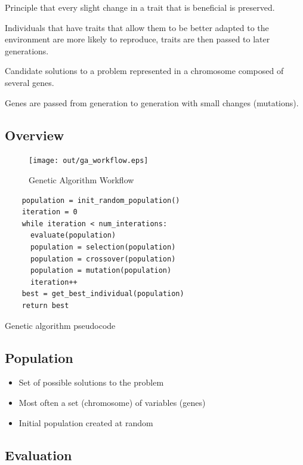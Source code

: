 \documentclass[a4paper]{article}
\begin{document}

Principle that every slight change in a trait that is beneficial is preserved.

Individuals that have traits that allow them to be better adapted to the
environment are more likely to reproduce, traits are then passed to later
generations.


Candidate solutions to a problem represented in a chromosome composed of several
genes.

Genes are passed from generation to generation with small changes (mutations).

\subsection{Overview}

\begin{figure}[h!]
  \centering
  \texttt{[image: out/ga\_workflow.eps]}
  \caption{Genetic Algorithm Workflow}
  \label{fig:ga_workflow}
\end{figure}
\FloatBarrier


\begin{listing}[h]
  \begin{verbatim}
    population = init_random_population()
    iteration = 0
    while iteration < num_interations:
      evaluate(population)
      population = selection(population)
      population = crossover(population)
      population = mutation(population)
      iteration++
    best = get_best_individual(population)
    return best
  \end{verbatim}
  \caption{Genetic algorithm pseudocode}
  \label{listing:ga_pseudocode}
\end{listing}

\subsection{Population}

\begin{itemize}
  \item Set of possible solutions to the problem
  \item Most often a set (chromosome) of variables (genes)
  \item Initial population created at random
\end{itemize}

\subsection{Evaluation}
\end{document}

